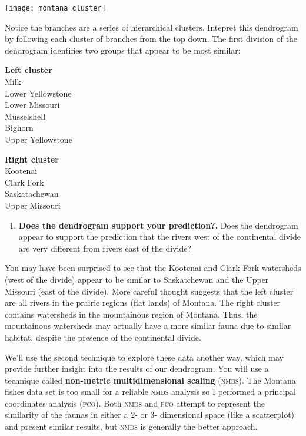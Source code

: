 \documentclass[11pt]{article}
\begin{document}
\begin{center}
	\texttt{[image: montana\_cluster]}
\end{center}

Notice the branches are a series of hierarchical clusters. Intepret this dendrogram
by following each cluster of branches from the top down. The first division of the dendrogram 
identifies two groups that appear to be most similar:

\begin{multicols}{2}
\textbf{Left cluster}\\
Milk\\
Lower Yellowstone\\
Lower Missouri\\
Musselshell\\
Bighorn\\
Upper Yellowstone
\columnbreak

\textbf{Right cluster}\\
Kootenai\\
Clark Fork\\
Saskatachewan\\
Upper Missouri
\end{multicols}

\begin{enumerate}[resume,leftmargin=*]
\item \textbf{Does the dendrogram support your prediction?.} Does the dendrogram appear
to support the prediction that the rivers west of the continental divide are very different
from rivers east of the divide?\vspace{10\baselineskip}
\end{enumerate}

\newpage

You may have been surprised to see that the Kootenai and Clark Fork watersheds 
(west of the divide) appear to be similar to Saskatchewan and the Upper Missouri 
(east of the divide). More careful thought suggests that the left cluster are all rivers in
the prairie regions (flat lands) of Montana. The right cluster contains watersheds in
the mountainous region of Montana. Thus, the mountainous watersheds may actually
have a more similar fauna due to similar habitat, despite the presence of the continental
divide.

We'll use the second technique to explore these data another way, which may provide 
further insight into the results of our dendrogram.  You will use a technique called 
\textbf{non-metric multidimensional scaling} (\textsc{nmds}). The Montana fishes data set
is too small for a reliable \textsc{nmds} analysis so I performed a principal
coordinates analysis (\textsc{pco}). Both \textsc{nmds} 
and \textsc{pco} attempt to represent the similarity of the faunas in either a 2- or 3-
dimensional space (like a scatterplot) and present similar results, but \textsc{nmds} is generally the better approach.
\end{document}
